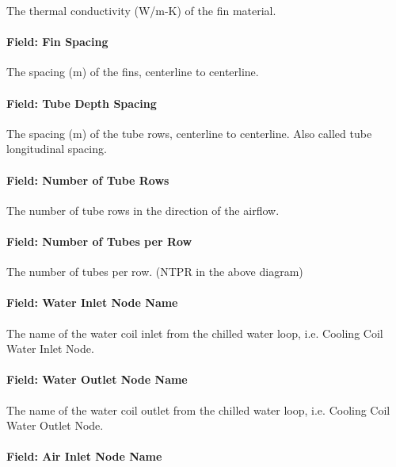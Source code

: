 The thermal conductivity (W/m-K) of the fin material.

\paragraph{Field: Fin Spacing}\label{field-fin-spacing}

The spacing (m) of the fins, centerline to centerline.

\paragraph{Field: Tube Depth Spacing}\label{field-tube-depth-spacing}

The spacing (m) of the tube rows, centerline to centerline. Also called tube longitudinal spacing.

\paragraph{Field: Number of Tube Rows}\label{field-number-of-tube-rows}

The number of tube rows in the direction of the airflow.

\paragraph{Field: Number of Tubes per Row}\label{field-number-of-tubes-per-row}

The number of tubes per row. (NTPR in the above diagram)

\paragraph{Field: Water Inlet Node Name}\label{field-water-inlet-node-name-3-000}

The name of the water coil inlet from the chilled water loop, i.e. Cooling Coil Water Inlet Node.

\paragraph{Field: Water Outlet Node Name}\label{field-water-outlet-node-name-3-000}

The name of the water coil outlet from the chilled water loop, i.e. Cooling Coil Water Outlet Node.

\paragraph{Field: Air Inlet Node Name}\label{field-air-inlet-node-name-8}

